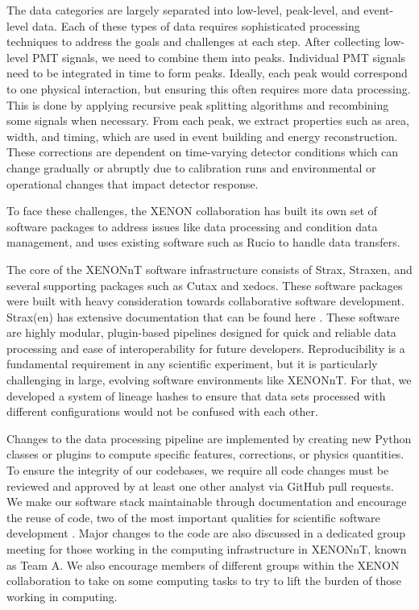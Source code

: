 The data categories are largely separated into low-level, peak-level, and event-level data. Each of these types of data requires sophisticated processing techniques to address the goals and challenges at each step. After collecting low-level PMT signals, we need to combine them into peaks. Individual PMT signals need to be integrated in time to form peaks. Ideally, each peak would correspond to one physical interaction, but ensuring this often requires more data processing. This is done by applying recursive peak splitting algorithms and recombining some signals when necessary. From each peak, we extract properties such as area, width, and timing, which are used in event building and energy reconstruction. These corrections are dependent on time-varying detector conditions which can change gradually or abruptly due to calibration runs and environmental or operational changes that impact detector response. 


To face these challenges, the XENON collaboration has built its own set of software packages to address issues like data processing and condition data management, and uses existing software such as Rucio to handle data transfers.

The core of the XENONnT software infrastructure consists of Strax, Straxen, and several supporting packages such as Cutax and xedocs. These software packages were built with heavy consideration towards collaborative software development. Strax(en) has extensive documentation that can be found here \cite{strax_main, straxen_pipeline}. These software are highly modular, plugin-based pipelines designed for quick and reliable data processing and ease of interoperability for future developers. Reproducibility is a fundamental requirement in any scientific experiment, but it is particularly challenging in large, evolving software environments like XENONnT. For that, we developed a system of lineage hashes to ensure that data sets processed with different configurations would not be confused with each other.


Changes to the data processing pipeline are implemented by creating new Python classes or plugins to compute specific features, corrections, or physics quantities. To ensure the integrity of our codebases, we require all code changes must be reviewed and approved by at least one other analyst via GitHub pull requests. We make our software stack maintainable through documentation and encourage the reuse of code, two of the most important qualities for scientific software development \cite{ARVANITOU2021110848}. Major changes to the code are also discussed in a dedicated group meeting for those working in the computing infrastructure in XENONnT, known as Team A. We also encourage members of different groups within the XENON collaboration to take on some computing tasks to try to lift the burden of those working in computing.

